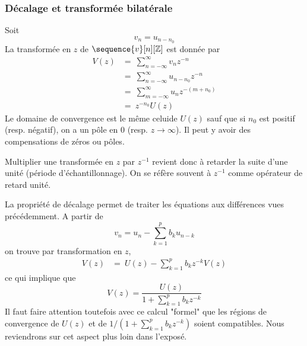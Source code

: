 \subsubsection{D\'{e}calage et transform\'{e}e bilat\'{e}rale}
Soit
$$
v_n =u_{n-n_{0}}
$$
La transform\'{e}e en $z$ de $\sequence{v}[n][\zset]$ est donn\'{e}e par
\begin{align*}
V(z) &=\ \sum_{n=-\infty}^{\infty} v_n z^{-n} \\
     &=\ \sum_{n=-\infty}^{\infty}u_{n-n_0}z^{-n} \\
     &=\ \sum_{m=-\infty}^{\infty}u_n z^{-(m+n_{0})} \\
     &=\ z^{-n_{0}} U(z)
\end{align*}
Le domaine de convergence est le m\^{e}me celuide $U(z)$ sauf que si $n_{0}$ est positif (resp. n\'{e}gatif), on a un p\^{o}le en $0$ (resp. $ z\rightarrow\infty$). Il peut y avoir des compensations de z\'{e}ros ou p\^{o}les.

Multiplier une transform\'{e}e en $z$ par $z^{-1}$ revient donc \`{a} retarder la suite d'une unit\'{e} (p\'{e}riode d'\'{e}chantillonnage). On se r\'{e}f\`{e}re souvent \`{a} $z^{-1}$ comme op\'{e}rateur de retard unit\'{e}.

La propri\'{e}t\'{e} de d\'{e}calage permet de traiter les \'{e}quations aux diff\'{e}rences vues pr\'{e}c\'{e}demment. A partir de
$$
v_n = u_n - \sum_{k=1}^p b_k u_{n-k}
$$
on trouve par transformation en $z$,
\begin{align*}
V(z) &=\ U(z)- \sum_{k=1}^p b_{k}z^{-k}V(z)
\end{align*}
ce qui implique que
\[
V(z) =\frac{U(z)}{1+ \sum_{k=1}^p b_{k}z^{-k}}
\]
Il faut faire attention toutefois avec ce calcul "formel" que les régions de convergence de $U(z)$ et de $1/ (1 + \sum_{k=1}^p b_k z^{-k})$ soient compatibles. Nous reviendrons sur cet aspect plus loin dans l'exposé.
